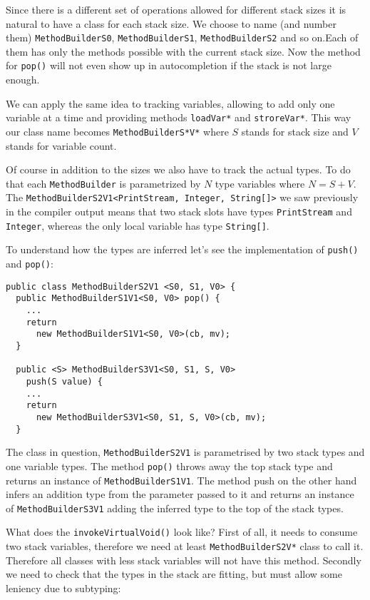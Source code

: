 \documentclass{sig-alternate}
\begin{document}
Since there is a different set of operations allowed for different stack sizes it is natural to have a class for each stack size. We choose to name (and number them) \verb!MethodBuilderS0!, \verb!MethodBuilderS1!, \verb!MethodBuilderS2! and so on.Each of them has only the methods possible with the current stack size. Now the method for \verb!pop()! will not even show up in autocompletion if the stack is not large enough.

We can apply the same idea to tracking variables, allowing to add only one variable at a time and providing methods \verb!loadVar*! and \verb!stroreVar*!. This way our class name becomes \verb!MethodBuilderS*V*! where $S$ stands for stack size and $V$ stands for variable count.

Of course in addition to the sizes we also have to track the actual types. To do that each \verb!MethodBuilder! is parametrized by $N$ type variables where $N = S + V$. The \verb!MethodBuilderS2V1<PrintStream, Integer, String[]>! we saw previously in the compiler output means that two stack slots have types \verb!PrintStream! and \verb!Integer!, whereas the only local variable has type \verb!String[]!.

To understand how the types are inferred let's see the implementation of \verb!push()! and \verb!pop()!:

\begin{verbatim}
public class MethodBuilderS2V1 <S0, S1, V0> {
  public MethodBuilderS1V1<S0, V0> pop() {
    ...
    return 
      new MethodBuilderS1V1<S0, V0>(cb, mv);
  }

  public <S> MethodBuilderS3V1<S0, S1, S, V0> 
    push(S value) {
    ...
    return 
      new MethodBuilderS3V1<S0, S1, S, V0>(cb, mv);
  }
\end{verbatim}

The class in question, \verb!MethodBuilderS2V1! is parametrised by two stack types and one variable types. The method \verb!pop()! throws away the top stack type and returns an instance of \verb!MethodBuilderS1V1!. The method push on the other hand infers an addition type from the parameter passed to it and returns an instance of \verb!MethodBuilderS3V1! adding the inferred type to the top of the stack types.

What does the \verb!invokeVirtualVoid()! look like? First of all, it needs to consume two stack variables, therefore we need at least \verb!MethodBuilderS2V*! class to call it. Therefore all classes with less stack variables will not have this method. Secondly we need to check that the types in the stack are fitting, but must allow some leniency due to subtyping:
\end{document}
